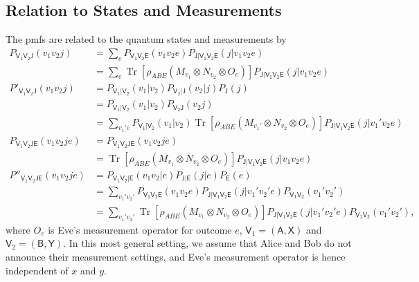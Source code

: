 \documentclass[10pt, a4paper]{article}
\numberwithin{equation}{section} %
\theoremstyle{definition}
\theoremstyle{plain}
\newcommand{\?}{\mathrel{?}} %
\newcommand{\Tr}[2][]{\mathop{\mathrm{Tr}#1}\left[ #2 \right]} %
\newcommand{\crv}[1]{\mathsf{#1}}
\begin{document}
                        \subsection{Relation to States and Measurements}\label{sec:ubound_statemeas}

                        The pmfs are related to the quantum states and measurements by
                        \begin{align}
                          P_{\crv{V_1V_2J}}(v_1v_2j) &= \sum_{e}  P_{\crv{V_1V_2E}}(v_1v_2e) P_{\crv{J|V_1V_2E}}(j|v_1v_2e) \\
                                                     &= \sum_{e} \Tr{\rho_{ABE} \left(M_{v_1} \otimes N_{v_2} \otimes O_e\right)} P_{\crv{J|V_1V_2E}}(j|v_1v_2e) \\
                          P'_{\crv{V}_1\crv{V}_2\crv{J}}(v_1v_2j) &= P_{\crv{V_1|V_2}}(v_1|v_2) P_{\crv{V}_2|\crv{J}}(v_2|j) P_{\crv{J}}(j) \\
                                                                  &= P_{\crv{V_1|V_2}}(v_1|v_2) P_{\crv{V_2J}}(v_2j) \\
                                                                  &= \sum_{v_1' e} P_{\crv{V_1|V_2}}(v_1|v_2) \Tr{\rho_{ABE} \left(M_{v_1'} \otimes N_{v_2} \otimes O_e\right)} P_{\crv{J|V_1V_2E}}(j|v_1'v_2e) \\
                          P_{\crv{V}_1\crv{V}_2\crv{JE}}(v_1v_2je) &= P_{\crv{V_1V_2JE}}(v_1v_2je) \\
                                                                   &= \Tr{\rho_{ABE} \left(M_{v_1} \otimes N_{v_2} \otimes O_e\right)} P_{\crv{J|V_1V_2E}}(j|v_1v_2e) \\
                          P''_{\crv{V}_1\crv{V}_2\crv{JE}}(v_1v_2je) &= P_{\crv{V_1V_2|E}}(v_1v_2|e) P_{\crv{J|E}}(j|e) P_{\crv{E}}(e) \\
                                                                     &= \sum_{v_1' v_2'} P_{\crv{V_1V_2E}}(v_1v_2e) P_{\crv{J|V_1V_2E}}(j|v_1'v_2'e) P_{\crv{V_1V_2}}(v_1'v_2') \\
                                                                     &= \sum_{v_1' v_2'} \Tr{\rho_{ABE} \left(M_{v_1} \otimes N_{v_2} \otimes O_e\right)} P_{\crv{J|V_1V_2E}}(j|v_1'v_2'e) P_{\crv{V_1V_2}}(v_1'v_2'),
                        \end{align}
                        where \(O_e\) is Eve's measurement operator for outcome \(e\), \(\crv{V}_1 = (\crv{A,X})\) and \(\crv{V}_2 = (\crv{B,Y})\). In this most general setting, we assume that Alice and Bob do not announce their measurement settings, and Eve's measurement operator is hence independent of \(x\) and \(y\).
\end{document}

